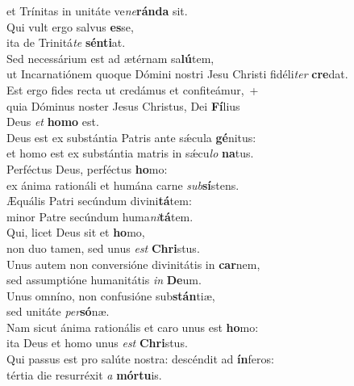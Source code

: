 \oddverse et Trínitas in unitáte ve\textit{ne}\textbf{rán}\textbf{da} sit.\\
\evenverse Qui vult ergo salvus \textbf{es}se,~\*\\
\evenverse ita de Trinitá\textit{te} \textbf{sén}\textbf{ti}at.\\
\oddverse Sed necessárium est ad ætérnam sa\textbf{lú}tem,~\*\\
\oddverse ut Incarnatiónem quoque Dómini nostri Jesu Christi fidéli\textit{ter} \textbf{cre}dat.\\
\evenverse Est ergo fides recta ut credámus et confiteámur,~+\\
\evenverse  quia Dóminus noster Jesus Christus, Dei \textbf{Fí}lius~\*\\
\evenverse Deus \textit{et} \textbf{ho}\textbf{mo} est.\\
\oddverse Deus est ex substántia Patris ante sǽcula \textbf{gé}nitus:~\*\\
\oddverse et homo est ex substántia matris in sǽcu\textit{lo} \textbf{na}tus.\\
\evenverse Perféctus Deus, perféctus \textbf{ho}mo:~\*\\
\evenverse ex ánima rationáli et humána carne \textit{sub}\textbf{sí}stens.\\
\oddverse Æquális Patri secúndum divini\textbf{tá}tem:~\*\\
\oddverse minor Patre secúndum huma\textit{ni}\textbf{tá}tem.\\
\evenverse Qui, licet Deus sit et \textbf{ho}mo,~\*\\
\evenverse non duo tamen, sed unus \textit{est} \textbf{Chri}stus.\\
\oddverse Unus autem non conversióne divinitátis in \textbf{car}nem,~\*\\
\oddverse sed assumptióne humanitátis \textit{in} \textbf{De}um.\\
\evenverse Unus omníno, non confusióne sub\textbf{stán}tiæ,~\*\\
\evenverse sed unitáte \textit{per}\textbf{só}næ.\\
\oddverse Nam sicut ánima rationális et caro unus est \textbf{ho}mo:~\*\\
\oddverse ita Deus et homo unus \textit{est} \textbf{Chri}stus.\\
\evenverse Qui passus est pro salúte nostra: descéndit ad \textbf{ín}feros:~\*\\
\evenverse tértia die resurréxit \textit{a} \textbf{mór}\textbf{tu}is.\\
